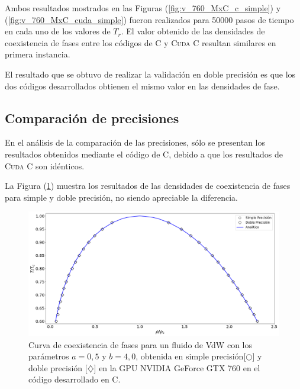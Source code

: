 Ambos resultados mostrados en las Figuras (\ref{fig:v_760_MxC_c_simple}) y (\ref{fig:v_760_MxC_cuda_simple}) fueron realizados para 50000 pasos de tiempo en cada uno de los valores de $T_r$. El valor obtenido de las densidades de coexistencia de fases entre los códigos de \textsc{C} y \textsc{Cuda C} resultan similares en primera instancia. 

El resultado que se obtuvo de realizar la validación en doble precisión es que los dos códigos desarrollados obtienen el mismo valor en las densidades de fase.

\newpage
\subsection{Comparación de precisiones}

En el análisis de la comparación de las precisiones, sólo se presentan los resultados obtenidos mediante el código de \textsc{C}, debido a que los resultados de \textsc{Cuda C} son idénticos.

La Figura (\ref{fig:v_760_MxC_c_comparacion}) muestra los resultados de las densidades de coexistencia de fases para simple y doble precisión, no siendo apreciable la diferencia.

\begin{figure}[htbp]
	\centering
	\includegraphics[width=\textwidth]{figs/cap4/v_760_MxC_c_comparacion}
	\caption{Curva de coexistencia de fases para un fluido de VdW con los parámetros $a = 0,5 $ y $b = 4,0 $, obtenida en simple precisión[$\bigcirc$] y doble precisión [$\diamondsuit$] en la GPU NVIDIA GeForce GTX 760 en el código desarrollado en \textsc{C}.} 
	\label{fig:v_760_MxC_c_comparacion}	
\end{figure}



